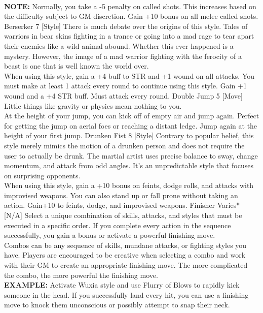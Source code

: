 \begin{path}
{\\\textbf{NOTE:} Normally, you take a -5 penalty on called shots. This increases based on the difficulty subject to GM discretion.}
{Gain +10 bonus on all melee called shots.}
\skilldescription
{Berserker}
{7}
[Style]
{There is much debate over the origins of this style. Tales of warriors in bear skins fighting in a trance or going into a mad rage to tear apart their enemies like a wild animal abound. Whether this ever happened is a mystery. However, the image of a mad warrior fighting with the ferocity of a beast is one that is well known the world over.
\\When using this style, gain a +4 buff to STR and +1 wound on all attacks. You must make at least 1 attack every round to continue using this style.}
{Gain +1 wound and a +4 STR buff. Must attack every round.}
\skilldescription
{Double Jump}
{5}
[Move]
{Little things like gravity or physics mean nothing to you.
\\At the height of your jump, you can kick off of empty air and jump again. Perfect for getting the jump on aerial foes or reaching a distant ledge.}
{Jump again at the height of your first jump.}
\skilldescription
{Drunken Fist}
{8}
[Style]
{Contrary to popular belief, this style merely mimics the motion of a drunken person and does not require the user to actually be drunk. The martial artist uses precise balance to sway, change momentum, and attack from odd angles. It’s an unpredictable style that focuses on surprising opponents.
\\When using this style, gain a +10 bonus on feints, dodge rolls, and attacks with improvised weapons. You can also stand up or fall prone without taking an action.}
{Gain+10 to feints, dodge, and improvised weapons.}
\skilldescription
{Finisher}
{Varies*}
[N/A]
{Select a unique combination of skills, attacks, and styles that must be executed in a specific order. If you complete every action in the sequence successfully, you gain a bonus or activate a powerful finishing move.
\\Combos can be any sequence of skills, mundane attacks, or fighting styles you have. Players are encouraged to be creative when selecting a combo and work with their GM to create an appropriate finishing move. The more complicated the combo, the more powerful the finishing move.
\\\textbf{EXAMPLE:} Activate Wuxia style and use Flurry of Blows to rapidly kick someone in the head. If you successfully land every hit, you can use a finishing move to knock them unconscious or possibly attempt to snap their neck.
}
\end{path}
